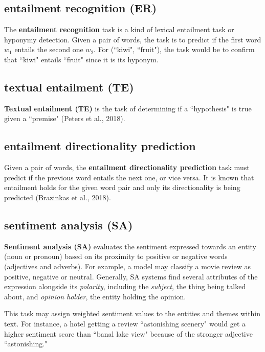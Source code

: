 \subsection{entailment recognition (ER)} \label{nlptask:entailmentrecognition}

The \textbf{entailment recognition} task is a kind of lexical entailment task or hyponymy detection. Given a pair of words, the task is to predict if the first word $w_1$ entails the second one $w_2$. For (``kiwi", ``fruit"), the task would be to confirm that ``kiwi" entails ``fruit" since it is its hyponym. 


\subsection{textual entailment (TE)} \label{nlptask:textualentailmentTE}

\textbf{Textual entailment (TE)} is the task of determining if a ``hypothesis" is true given a ``premise" (Peters et al., 2018). 

\subsection{entailment directionality prediction} \label{nlptask:entailmentdirectionalityprediction}

Given a pair of words, the \textbf{entailment directionality prediction} task must predict if the previous word entails the next one, or vice versa. It is known that entailment holds for the given word pair and only its directionality is being predicted (Brazinkas et al., 2018). 



\subsection{sentiment analysis (SA)} \label{nlptask:sentimentanalysisSA}

\textbf{Sentiment analysis (SA)} evaluates the sentiment expressed towards an entity (noun or pronoun) based on its proximity to positive or negative words (adjectives and adverbs). For example, a model may classify a movie review as positive, negative or neutral. Generally, SA systems find several attributes of the expression alongside its \emph{polarity}, including the \emph{subject}, the thing being talked about, and \emph{opinion holder}, the entity holding the opinion. 

This task may assign weighted sentiment values to the entities and themes within text. For instance, a hotel getting a review ``astonishing scenery" would get a higher sentiment score than ``banal lake view" because of the stronger adjective ``astonishing." 


